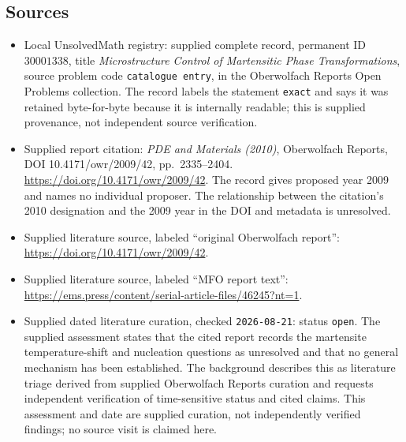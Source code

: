 \documentclass[11pt]{article}
\begin{document}
\subsection{Sources}
\begin{itemize}
\item Local UnsolvedMath registry: supplied complete record, permanent ID \(30001338\), title \emph{Microstructure Control of Martensitic Phase Transformations}, source problem code \texttt{catalogue entry}, in the Oberwolfach Reports Open Problems collection. The record labels the statement \texttt{exact} and says it was retained byte-for-byte because it is internally readable; this is supplied provenance, not independent source verification.
\item Supplied report citation: \emph{PDE and Materials (2010)}, Oberwolfach Reports, DOI 10.4171/owr/2009/42, pp.\ 2335--2404. \url{https://doi.org/10.4171/owr/2009/42}. The record gives proposed year 2009 and names no individual proposer. The relationship between the citation's 2010 designation and the 2009 year in the DOI and metadata is unresolved.
\item Supplied literature source, labeled ``original Oberwolfach report'': \url{https://doi.org/10.4171/owr/2009/42}.
\item Supplied literature source, labeled ``MFO report text'': \url{https://ems.press/content/serial-article-files/46245?nt=1}.
\item Supplied dated literature curation, checked \texttt{2026-08-21}: status \texttt{open}. The supplied assessment states that the cited report records the martensite temperature-shift and nucleation questions as unresolved and that no general mechanism has been established. The background describes this as literature triage derived from supplied Oberwolfach Reports curation and requests independent verification of time-sensitive status and cited claims. This assessment and date are supplied curation, not independently verified findings; no source visit is claimed here.
\end{itemize}
\end{document}
